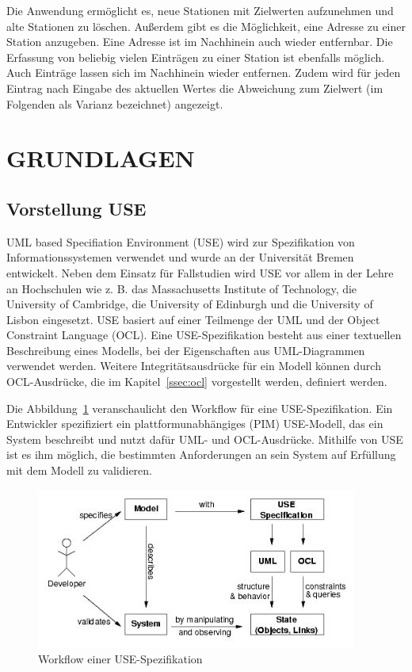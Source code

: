 \documentclass[a4paper,twoside]{article}
\begin{document}
Die Anwendung ermöglicht es, neue Stationen mit Zielwerten aufzunehmen und alte Stationen zu löschen. Außerdem gibt es die Möglichkeit, eine Adresse zu einer Station anzugeben. Eine Adresse ist im Nachhinein auch wieder entfernbar. Die Erfassung von beliebig vielen Einträgen zu einer Station ist ebenfalls möglich. Auch Einträge lassen sich im Nachhinein wieder entfernen. Zudem wird für jeden Eintrag nach Eingabe des aktuellen Wertes die Abweichung zum Zielwert (im Folgenden als Varianz bezeichnet) angezeigt.


\section{\uppercase{Grundlagen}}
\label{sec:basics}
\noindent

\subsection{Vorstellung USE} 
\label{ssec:use}
UML based Specifiation Environment (USE) wird zur Spezifikation von Informationssystemen verwendet und wurde an der Universität Bremen entwickelt. Neben dem Einsatz für Fallstudien wird USE vor allem in der Lehre an Hochschulen wie z. B. das Massachusetts Institute of Technology, die University of Cambridge, die University of Edinburgh und die University of Lisbon eingesetzt. USE basiert auf einer Teilmenge der UML und der Object Constraint Language (OCL). Eine USE-Spezifikation besteht aus einer textuellen Beschreibung eines Modells, bei der Eigenschaften aus UML-Diagrammen verwendet werden. Weitere Integritätsausdrücke für ein Modell können durch OCL-Ausdrücke, die im Kapitel~\ref{ssec:ocl} vorgestellt werden, definiert werden. \cite{Use07} 


Die Abbildung~\ref{fig:Grafik1} veranschaulicht den Workflow für eine USE-Spezifikation. Ein Entwickler spezifiziert ein plattformunabhängiges (PIM) USE-Modell, das ein System beschreibt und nutzt dafür UML- und OCL-Ausdrücke. Mithilfe von USE ist es ihm möglich, die bestimmten Anforderungen an sein System auf Erfüllung mit dem Modell zu validieren.

\begin{figure}[!h]
	\includegraphics[scale=.7]{pics/USE_workflow.jpg}
	\caption{Workflow einer USE-Spezifikation \cite{Data07}}
	\label{fig:Grafik1}
\end{figure}
\end{document}
